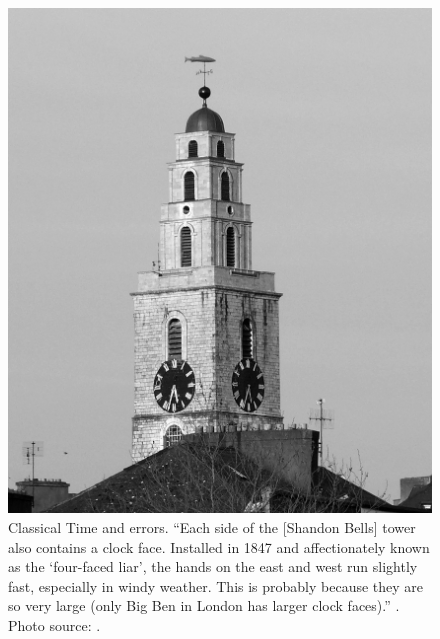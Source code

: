 \begin{savenotes}
\begin{figure}[]
  \centering
  \includegraphics[height=.5\textheight]{img/Shandon_bells_cork.BW.jpg}
  \caption[
    Classical Time. The \emph{Four Faced Liar}, Shandon Bells, Cork
  ]{
    Classical Time and errors.
    ``Each side of the [Shandon Bells] tower also contains a clock face.
    Installed in 1847 and affectionately known as the
    `four-faced liar', the hands on the east and west run slightly fast, especially in windy weather.
    This is probably because they are so very large
    (only Big Ben in London has larger clock faces).''
    \parencite{CorkStrolls}. Photo source: \cite{ShandonBells}.
  }
  \label{fig:ShandonBells}
\end{figure}
\end{savenotes}